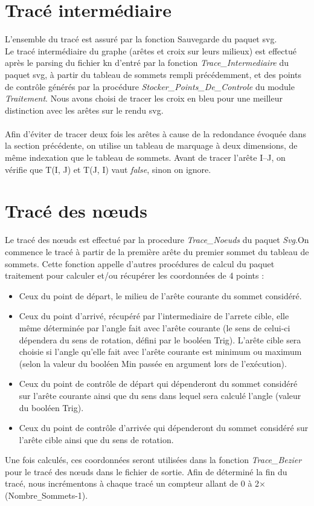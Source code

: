 \documentclass[12pt]{article}
\begin{document}
\section {Tracé intermédiaire}
L'ensemble du tracé est assuré par la fonction Sauvegarde du paquet svg.
\\
Le tracé intermédiaire du graphe (arêtes et croix sur leurs milieux) est effectué après le parsing du fichier kn d'entré par la fonction
\emph{Trace\_Intermediaire} du paquet svg, à partir du tableau de
sommets rempli précédemment, et des points de contrôle générés par la
procédure \emph{Stocker\_Points\_De\_Controle} du module
\emph{Traitement}. 
Nous avons choisi de tracer les croix en bleu pour une meilleur
distinction avec les arêtes sur le rendu svg.\\
\\
Afin d'éviter de tracer deux fois les arêtes à cause de la redondance
évoquée dans la section précédente, on utilise un tableau de marquage à deux
dimensions, de même indexation que le tableau de sommets. Avant de
tracer l'arête I--J, on vérifie que T(I, J) et T(J, I) vaut \emph{false},
sinon on ignore.
\section {Tracé des nœuds}
Le tracé des nœuds est effectué par la procedure \emph{Trace\_Noeuds} du
paquet \emph{Svg}.On commence le tracé à partir de la première arête du premier sommet du tableau de sommets. Cette fonction appelle d'autres procédures de calcul du paquet traitement pour calculer et/ou récupérer les coordonnées de 4 points :
\begin{itemize}
\item Ceux du point de départ, le milieu de l'arête courante du sommet considéré.
\item Ceux du point d'arrivé, récupéré par l'intermediaire de l'arrete cible, elle même déterminée par l'angle fait avec l'arête courante (le sens de celui-ci dépendera du sens de rotation, défini par le booléen Trig). L'arête cible sera choisie si l'angle qu'elle fait avec l'arête courante est minimum ou maximum (selon la valeur du booléen Min passée en argument lors de l'exécution).
\item Ceux du point de contrôle de départ qui dépenderont du sommet considéré sur l'arête courante ainsi que du sens dans lequel sera calculé l'angle (valeur du booléen Trig).
\item Ceux du point de contrôle d'arrivée qui dépenderont du sommet considéré sur l'arête cible ainsi que du sens de rotation.
\end{itemize}
Une fois calculés, ces coordonnées seront utilisées dans la fonction
\emph{Trace\_Bezier} pour le tracé des nœuds dans le fichier de sortie. 
Afin de déterminé la fin du tracé, nous incrémentons à chaque tracé un
compteur allant de 0 à 2$\times$(Nombre\verb+_+Sommets-1). 
\end{document}
